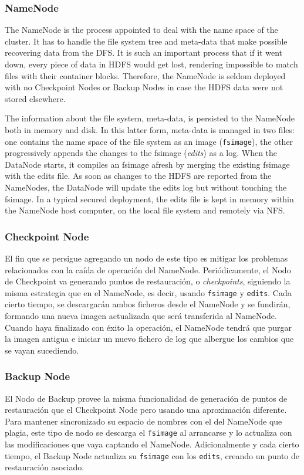 \subsubsection{NameNode}\label{subsubsec:namenode}
\noindent The NameNode is the process appointed to deal with the name space of the cluster. It has to handle the file system tree and meta-data that make possible recovering data from the DFS. It is such an important process that if it went down, every piece of data in HDFS would get lost, rendering impossible to match files with their container blocks. Therefore, the NameNode is seldom deployed with no Checkpoint Nodes or Backup Nodes in case the HDFS data were not stored elsewhere.

The information about the file system, meta-data, is persisted to the NameNode both in memory and disk. In this latter form, meta-data is managed in two files: one contains the name space of the file system as an image (\texttt{fsimage}), the other progressively appends the changes to the fsimage (\emph{edits}) as a log. When the DataNode starts, it compiles an fsimage afresh by merging the existing fsimage with the edits file. As soon as changes to the HDFS are reported from the NameNodes, the DataNode will update the edits log but without touching the fsimage. In a typical secured deployment, the edits file is kept in memory within the NameNode host computer, on the local file system and remotely via NFS.

\subsubsection{Checkpoint Node}\label{subsubsec:checkpointnode}
\noindent El fin que se persigue agregando un nodo de este tipo es mitigar los problemas relacionados con la ca\'ida de operaci\'on del NameNode. Peri\'odicamente, el Nodo de Checkpoint va generando puntos de restauraci\'on, o \emph{checkpoints}, siguiendo la misma estrategia que en el NameNode, es decir, usando \texttt{fsimage} y \texttt{edits}. Cada cierto tiempo, se descargar\'an ambos ficheros desde el NameNode y se fundir\'an, formando una nueva imagen actualizada que ser\'a transferida al NameNode. Cuando haya finalizado con \'exito la operaci\'on, el NameNode tendr\'a que purgar la imagen antigua e iniciar un nuevo fichero de log que albergue los cambios que se vayan sucediendo.


\subsubsection{Backup Node}\label{subsubsec:backupnode}
\noindent El Nodo de Backup provee la misma funcionalidad de generaci\'on de puntos de restauraci\'on que el Checkpoint Node pero usando una aproximaci\'on diferente. Para mantener sincronizado su espacio de nombres con el del NameNode que plagia, este tipo de nodo se descarga el \texttt{fsimage} al arrancarse y lo actualiza con las modificaciones que vaya captando el NameNode. Adicionalmente y cada cierto tiempo, el Backup Node actualiza su \texttt{fsimage} con los \texttt{edits}, creando un punto de restauraci\'on asociado.\newline

